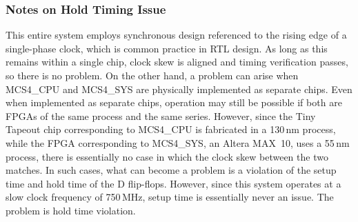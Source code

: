 \subsubsection*{Notes on Hold Timing Issue}
This entire system employs synchronous design referenced to the rising edge of a single-phase clock, which is common practice in RTL design. As long as this remains within a single chip, clock skew is aligned and timing verification passes, so there is no problem. On the other hand, a problem can arise when MCS4\_CPU and MCS4\_SYS are physically implemented as separate chips. Even when implemented as separate chips, operation may still be possible if both are FPGAs of the same process and the same series. However, since the Tiny Tapeout chip corresponding to MCS4\_CPU is fabricated in a 130\,nm process, while the FPGA corresponding to MCS4\_SYS, an Altera MAX~10, uses a 55\,nm process, there is essentially no case in which the clock skew between the two matches. In such cases, what can become a problem is a violation of the setup time and hold time of the D flip-flops. However, since this system operates at a slow clock frequency of 750\,MHz, setup time is essentially never an issue. The problem is hold time violation.

